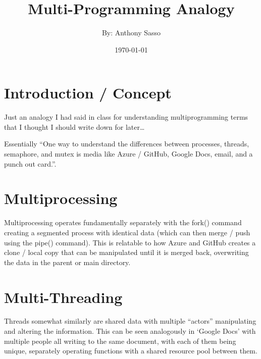 \documentclass{article}
\title{\Huge Multi-Programming Analogy}
\author{By: Anthony Sasso}
\date{\today}
\begin{document}
    
    \maketitle

    \begin{versionhistory}

    \end{versionhistory}

    \tableofcontents

    \newpage
    \section{Introduction / Concept}
    
    Just an analogy I had said in class for understanding multiprogramming terms that I thought I should write down for later\dots

    \bigskip
    Essentially ``One way to understand the differences between processes, threads, semaphore, and mutex is media like Azure / GitHub, Google Docs, email, and a punch out card.''.

    \section{Multiprocessing}
    
    Multiprocessing operates fundamentally separately with the fork() command creating a segmented process with identical data (which can then merge / push using the pipe() command). This is relatable to how Azure and GitHub creates a clone / local copy that can be manipulated until it is merged back, overwriting the data in the parent or main directory.

    \section{Multi-Threading}

    Threads somewhat similarly are shared data with multiple ``actors'' manipulating and altering the information. This can be seen analogously in `Google Docs' with multiple people all writing to the same document, with each of them being unique, separately operating functions with a shared resource pool between them.
\end{document}
